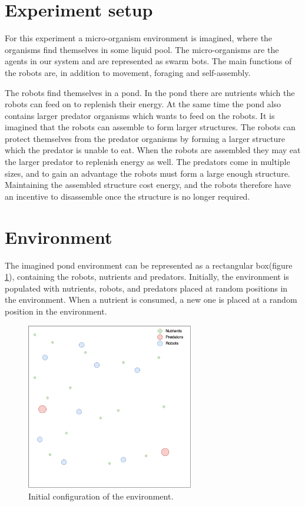 \section{Experiment setup}
\label{sec:description}
For this experiment a micro-organism environment is imagined, where the organisms find themselves in some liquid pool. 
The micro-organisms are the agents in our system and are represented as swarm bots.
The main functions of the robots are, in addition to movement, foraging and self-assembly.

The robots find themselves in a pond.
In the pond there are nutrients which the robots can feed on to replenish their energy.
At the same time the pond also contains larger predator organisms which wants to feed on the robots.
It is imagined that the robots can assemble to form larger structures.
The robots can protect themselves from the predator organisms by forming a larger structure which the predator is unable to eat.
When the robots are assembled they may eat the larger predator to replenish energy as well.
The predators come in multiple sizes, and to gain an advantage the robots must form a large enough structure.
Maintaining the assembled structure cost energy, and the robots therefore have an incentive to disassemble once the structure is no longer required.

\section{Environment}
The imagined pond environment can be represented as a rectangular box(figure \ref{fig:environment}), containing the robots, nutrients and predators.
Initially, the environment is populated with nutrients, robots, and predators placed at random positions in the environment.
When a nutrient is consumed, a new one is placed at a random position in the environment.

\begin{figure}[H]
	
	\centering
	\includegraphics[width=0.65\textwidth]{chapters/res/Environment.png}
	\caption{Initial configuration of the environment.}
	\label{fig:environment}
\end{figure}


